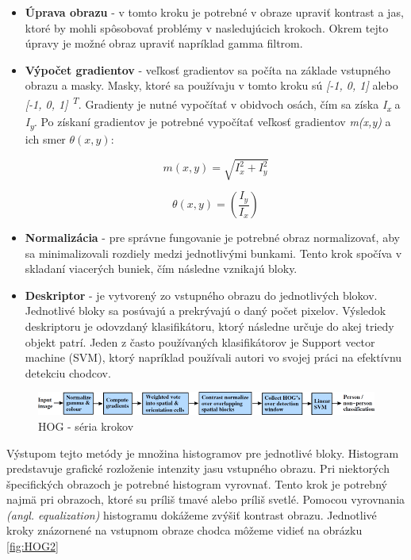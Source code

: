 \documentclass[slovak,master,dept460,male,cpp,cpdeclaration]{diploma}
\begin{document}
\begin{itemize}
  \item \textbf{Úprava obrazu} - v tomto kroku je potrebné  v obraze upraviť kontrast a jas, ktoré by mohli spôsobovať  problémy v nasledujúcich krokoch. Okrem tejto úpravy  je možné obraz upraviť napríklad gamma filtrom.
  \item \textbf{Výpočet gradientov} - veľkosť gradientov sa počíta na základe vstupného obrazu a masky. Masky, ktoré sa používaju v tomto kroku sú \textit{[-1, 0, 1]} alebo \textit{[-1, 0, 1] \textsuperscript{T}}. Gradienty je nutné vypočítať v obidvoch osách, čím sa získa \textit{I\textsubscript{x}} a \textit{I\textsubscript{y}}. Po získaní gradientov je potrebné vypočítať veľkosť gradientov \textit{m(x,y)} a ich smer \textit{$\theta(x, y)$}:
  
\begin{equation}
m(x,y)= \sqrt{I_{x}^{2} + I_{y}^{2}}
\label{eq:Výpočet veľkosti gradientu}
\end{equation}

  \begin{equation}
\theta(x, y) = \left(\frac{I_{y}}{I_{x}}\right)
\label{eq:Výpočet smeru gradientu}
\end{equation}
  \item \textbf{Normalizácia} -  pre správne fungovanie je potrebné obraz normalizovať, aby sa minimalizovali rozdiely medzi jednotlivými bunkami. Tento krok spočíva v skladaní viacerých buniek, čím následne vznikajú bloky. 
   \item \textbf{Deskriptor} -  je vytvorený zo vstupného obrazu do jednotlivých blokov. Jednotlivé bloky sa posúvajú a prekrývajú o daný počet pixelov. Výsledok deskriptoru je odovzdaný  klasifikátoru, ktorý následne určuje do akej triedy objekt patrí. Jeden z často používaných klasifikátorov je Support vector machine (SVM), ktorý napríklad používali autori vo svojej práci na efektívnu detekciu chodcov.\cite{pang2011efficient}
 \end{itemize}


\begin{figure}[H]
	\centering
	\includegraphics[width=1\textwidth]{Figures/hog.png}
	\caption{HOG - séria krokov \cite{dalal2005}}
	\label{fig:HOG1}
\end{figure}

Výstupom tejto metódy je množina histogramov pre jednotlivé bloky. Histogram predstavuje grafické rozloženie intenzity jasu vstupného obrazu. Pri niektorých špecifických obrazoch je potrebné histogram vyrovnať. Tento krok je potrebný najmä pri obrazoch, ktoré su príliš tmavé alebo príliš svetlé. Pomocou vyrovnania \textit{(angl. equalization)} histogramu  dokážeme zvýšiť kontrast obrazu. Jednotlivé kroky znázornené na vstupnom obraze chodca môžeme vidieť na obrázku \ref{fig:HOG2}\par
\end{document}

